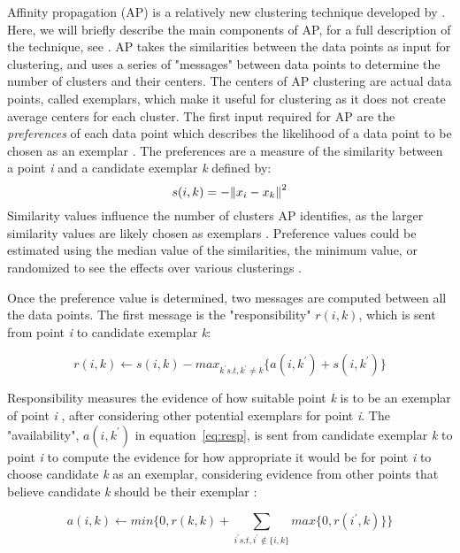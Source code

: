 Affinity propagation (AP) is a relatively new clustering technique developed by \citet{frey07}.
Here, we will briefly describe the main components of AP, for a full description of the technique, see \citet{frey07}.
AP takes the similarities between the data points as input for clustering, and uses a series of "messages" between data points to determine the number of clusters and their centers.
The centers of AP clustering are actual data points, called exemplars, which make it useful for clustering as it does not create average centers for each cluster. 
The first input required for AP are the \textit{preferences} of each data point which describes the likelihood of a data point to be chosen as an exemplar \citet{frey07}.
The preferences are a measure of the similarity between a point \textit{i} and a candidate exemplar \textit{k} defined by: 
\begin{equation}
\label{eq:sim}
s(i,k) = -\norm{x_i - x_k}^2
\end{equation}
Similarity values influence the number of clusters AP identifies, as the larger similarity values are likely chosen as exemplars \citet{frey07}.
Preference values could be estimated using the median value of the similarities, the minimum value, or randomized to see the effects over various clusterings \citet{frey07}.

Once the preference value is determined, two messages are computed between all the data points.
The first message is the "responsibility" $r(i,k)$, which is sent from point \textit{i} to candidate exemplar \textit{k}:\citet{frey07}

\begin{equation}
\label{eq:resp}
r(i,k) \leftarrow s(i,k) - max_{k^\prime s.t,  k^\prime \neq k} \{ a(i,k^\prime) + s(i,k^\prime) \}
\end{equation}

Responsibility measures the evidence of how suitable point \textit{k} is to be an exemplar of point \textit{i} \citet{frey07}, after considering other potential exemplars for point \textit{i}.
The "availability", $a(i,k^\prime)$ in equation~\ref{eq:resp}, is sent from candidate exemplar \textit{k} to point \textit{i} to compute the evidence for how appropriate it would be for point \textit{i} to choose candidate \textit{k} as an exemplar, considering evidence from other points that believe candidate \textit{k} should be their exemplar \citet{frey07}: 

\begin{equation}
\label{eq:avail}
a(i,k) \leftarrow min\Big\{ 0, r(k,k) + \sum\limits_{i^\prime s.t, i^\prime \notin \{i,k\}} max\{0, r(i^\prime, k)\}\Big\}
\end{equation}

